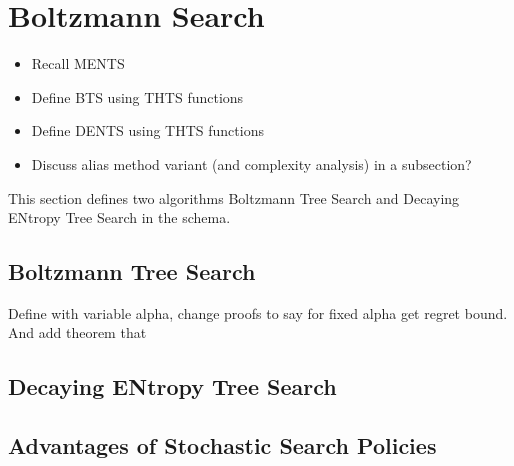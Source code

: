 \section{Boltzmann Search}
\label{sec:4-2-boltzmannsearch}

    \begin{itemize}
        \item Recall MENTS
        \item Define BTS using THTS functions
        \item Define DENTS using THTS functions
        \item Discuss alias method variant (and complexity analysis) in a subsection?
    \end{itemize}


    This section defines two algorithms Boltzmann Tree Search and Decaying ENtropy Tree Search in the \thtspp\ewe schema. 
    
    \subsection{Boltzmann Tree Search}


        Define with variable alpha, change proofs to say for fixed alpha get regret bound. And add theorem that 
    
    \subsection{Decaying ENtropy Tree Search}


    \subsection{Advantages of Stochastic Search Policies}


